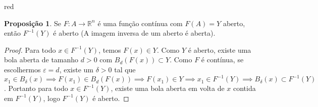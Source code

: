 \documentclass[12pt,leqno,twoside]{amsart}
\theoremstyle{definition}
\newtheorem{proposicao}{Proposição}[section]
\newtheorem{definicao}{Definição}[section]
\begin{document}
\begin{color}{red}
\vspace{0.3cm}

\begin{comment}
	\begin{definicao}[Cobertura]
		Dado $X\subset \mathbb{R}^n$. Uma cobertura de $X$ é uma família $C= (C_{\lambda})_{\lambda \in L}$ de conjuntos $C_{\lambda} \subset \mathbb{R}^n$ tais que $X  \subset \displaystyle\bigcup_{\lambda \in L} C_{\lambda}$; isto é, para todo $x \in X$, existe algum $\lambda \in L$ tal que $x\in C_{\lambda}$.
	\end{definicao}
	\begin{definicao}[Cobertura Aberta]
		Dado $X\subset \mathbb{R}^n$ e uma cobertura $C= (C_{\lambda})_{\lambda \in L}$. $C$ é uma cobertura aberta se todo $C_{\lambda}$ é aberto em $\mathbb{R}^n$.
	\end{definicao}
	\begin{definicao}[Cobertura Finita]
		Dado $X\subset \mathbb{R}^n$ e uma cobertura $C= (C_{\lambda})_{\lambda \in L}$. C é uma cobertura finita quando $L$ é finito.
	\end{definicao}
	\begin{definicao}[Subcobertura]
		Dado $X\subset \mathbb{R}^n$ e uma cobertura $C= (C_{\lambda})_{\lambda \in L}$. Uma subcobertura de $C$ é uma família $C'= (C_{\lambda})_{\lambda \in L'}$, $L' \subset L$, tal que ainda se tenha $X\subset \displaystyle \bigcup_{\lambda \in L'} C_{\lambda}$.
	\end{definicao}
	\begin{proposicao}
		Um conjunto $X \subset \mathbb{R}^n$ é compacto se, e somente se, toda cobertura aberta $C$ de $X$ possui subcobertura finita.
	\end{proposicao}
\end{comment}

\vspace{0.3cm}

\begin{proposicao}
	\label{prop:openset}
	Se $F:A\to \mathbb{R}^n$ é uma função contínua com $F(A) = Y$  aberto, então $F^{-1}(Y)$ é aberto (A imagem inversa de um aberto é aberta).
\end{proposicao}
\begin{proof}
	Para todo $x\in F^{-1}(Y) $, temos  $ F(x) \in Y$. Como $Y$ é aberto, existe uma bola aberta de tamanho $d>0$ com  $B_{d}(F(x)) \subset Y$. Como $F$ é contínua, se escolhermos $\varepsilon = d$, existe um $\delta>0$ tal que $x_1 \in B_{\delta}(x) \implies  F(x_1)\in B_{d}(F(x)) \implies F(x_1) \in Y \implies x_1 \in F^{-1}(Y) \implies B_{\delta}(x)  \subset F^{-1}(Y)$. Portanto para todo $x \in F^{-1}(Y)$, existe uma bola aberta em volta de $x$ contida em $F^{-1}(Y)$, logo $F^{-1}(Y)$ é aberto.
\end{proof}


\end{color}
\end{document}
